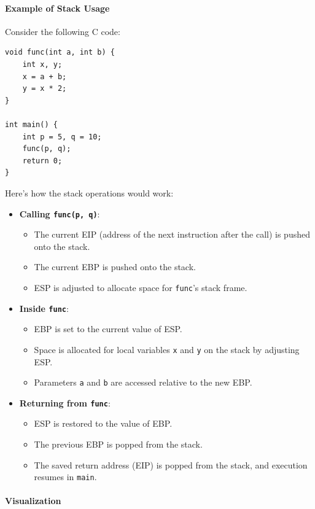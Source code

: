 \paragraph{Example of Stack Usage}

Consider the following C code:

\begin{lstlisting}
void func(int a, int b) {
    int x, y;
    x = a + b;
    y = x * 2;
}

int main() {
    int p = 5, q = 10;
    func(p, q);
    return 0;
}
\end{lstlisting}

Here’s how the stack operations would work:

\begin{itemize}
    \item \textbf{Calling \texttt{func(p, q)}}:
    \begin{itemize}
        \item The current EIP (address of the next instruction after the call) is pushed onto the stack.
        \item The current EBP is pushed onto the stack.
        \item ESP is adjusted to allocate space for \texttt{func}'s stack frame.
    \end{itemize}
    \item \textbf{Inside \texttt{func}}:
    \begin{itemize}
        \item EBP is set to the current value of ESP.
        \item Space is allocated for local variables \texttt{x} and \texttt{y} on the stack by adjusting ESP.
        \item Parameters \texttt{a} and \texttt{b} are accessed relative to the new EBP.
    \end{itemize}
    \item \textbf{Returning from \texttt{func}}:
    \begin{itemize}
        \item ESP is restored to the value of EBP.
        \item The previous EBP is popped from the stack.
        \item The saved return address (EIP) is popped from the stack, and execution resumes in \texttt{main}.
    \end{itemize}
\end{itemize}


\paragraph{Visualization}

